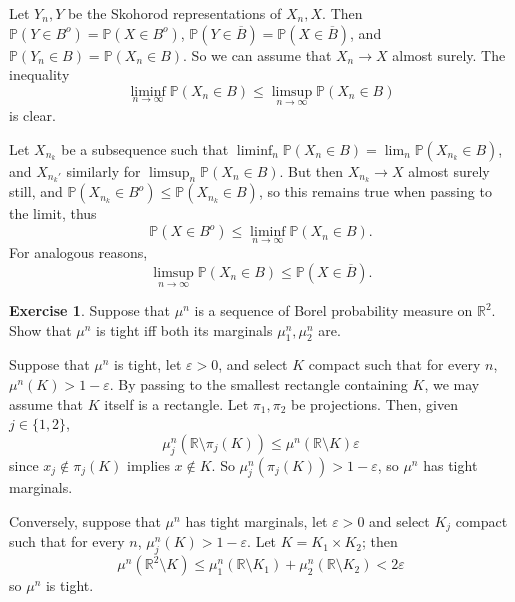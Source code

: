 \documentclass[10pt]{article}
\newcommand{\RR}{\mathbb{R}}
\newcommand{\PP}{\mathbb P}
\theoremstyle{definition}
\newtheorem{exer}{Exercise}
\begin{document}
Let $Y_n,Y$ be the Skohorod representations of $X_n,X$.
Then $\PP(Y \in B^o) = \PP(X \in B^o)$, $\PP(Y \in \overline B) = \PP(X \in \overline B)$, and $\PP(Y_n \in B) = \PP(X_n \in B)$.
So we can assume that $X_n \to X$ almost surely.
The inequality
$$\liminf_{n \to \infty} \PP(X_n \in B) \leq \limsup_{n \to \infty} \PP(X_n \in B)$$
is clear.

Let $X_{n_k}$ be a subsequence such that $\liminf_n \PP(X_n \in B) = \lim_n \PP(X_{n_k} \in B)$, and $X_{n_k'}$ similarly for $\limsup_n \PP(X_n \in B)$.
But then $X_{n_k} \to X$ almost surely still, and $\PP(X_{n_k} \in B^o) \leq \PP(X_{n_k} \in B)$, so this remains true when passing to the limit, thus
$$\PP(X \in B^o) \leq \liminf_{n \to \infty} \PP(X_n \in B).$$
For analogous reasons,
$$\limsup_{n \to \infty} \PP(X_n \in B) \leq \PP(X \in \overline B).$$


\begin{exer}
Suppose that $\mu^n$ is a sequence of Borel probability measure on $\RR^2$.
Show that $\mu^n$ is tight iff both its marginals $\mu^n_1,\mu^n_2$ are.
\end{exer}

Suppose that $\mu^n$ is tight, let $\varepsilon > 0$, and select $K$ compact such that for every $n$, $\mu^n(K) > 1 - \varepsilon$.
By passing to the smallest rectangle containing $K$, we may assume that $K$ itself is a rectangle.
Let $\pi_1,\pi_2$ be projections. Then, given $j \in \{1, 2\}$,
$$\mu^n_j(\RR \setminus \pi_j(K)) \leq \mu^n(\RR \setminus K) \varepsilon$$
since $x_j \notin \pi_j(K)$ implies $x \notin K$.
So $\mu^n_j(\pi_j(K)) > 1 - \varepsilon$, so $\mu^n$ has tight marginals.

Conversely, suppose that $\mu^n$ has tight marginals, let $\varepsilon > 0$ and select $K_j$ compact such that for every $n$, $\mu^n_j(K) > 1 - \varepsilon$.
Let $K = K_1 \times K_2$; then
$$\mu^n(\RR^2 \setminus K) \leq \mu^n_1(\RR \setminus K_1) + \mu^n_2(\RR \setminus K_2) < 2\varepsilon$$
so $\mu^n$ is tight.
\end{document}
